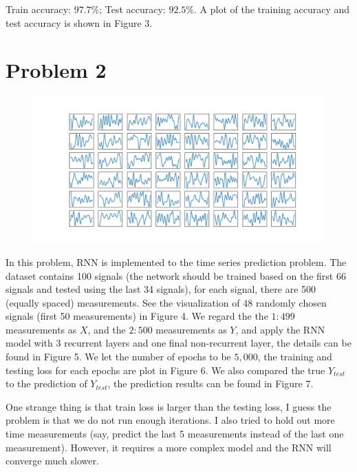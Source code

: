 \documentclass[12pt]{article}
\begin{document}
Train accuracy: $97.7\%$; Test accuracy: $92.5\%$. A plot of the training accuracy and test accuracy is shown in Figure 3.





\section*{Problem 2}

\begin{figure}[h] 
\centering
\includegraphics[width=1.0\textwidth]{train_examples2.png}
\caption{}
\end{figure}

In this problem, RNN is implemented to the time series prediction problem. The dataset contains 100 signals (the network should be trained based on the first 66 signals and tested using the last 34 signals), for each signal, there are 500 (equally spaced) measurements. See the visualization of 48 randomly chosen signals (first 50 measurements) in Figure 4. We regard the the $1:499$ measurements as $X$, and the $2:500$ measurements as $Y$, and apply the RNN model with 3 recurrent layers and one final non-recurrent layer, the details can be found in Figure 5. We let the number of epochs to be $5,000$, the training and testing loss for each epochs are plot in Figure 6. We also compared the true $Y_{test}$ to the prediction of $Y_{test}$, the prediction results can be found in Figure 7.

One strange thing is that train loss is larger than the testing loss, I guess the problem is that we do not run enough iterations. I also tried to hold out more time measurements (say, predict the last 5 measurements instead of the last one measurement). However, it requires a more complex model and the RNN will converge much slower.
\end{document}
